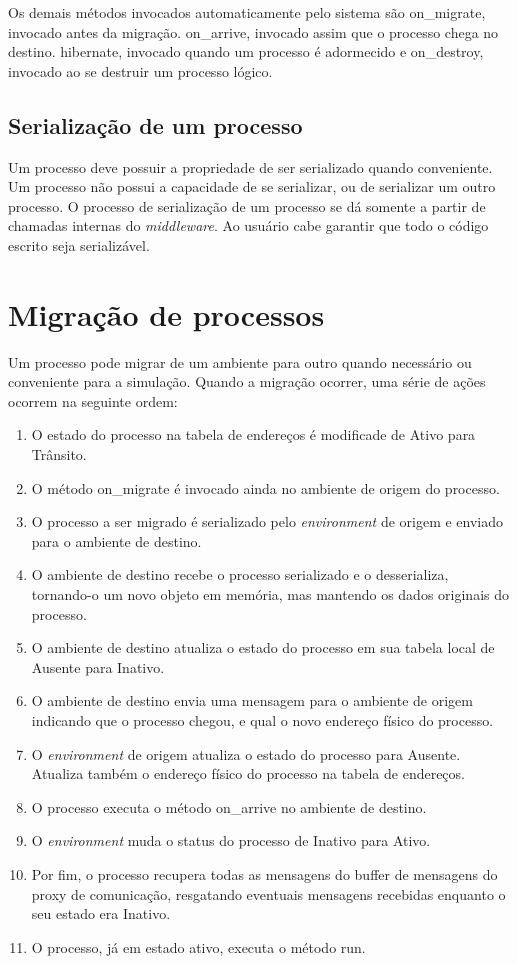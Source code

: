 Os demais métodos invocados automaticamente pelo sistema são on\_migrate, invocado antes da migração. on\_arrive, invocado assim que o processo chega no destino. hibernate, invocado quando um processo é adormecido e on\_destroy, invocado ao se destruir um processo lógico.

\subsection{Serialização de um processo}

Um processo deve possuir a propriedade de ser serializado quando conveniente. Um processo não possui a capacidade de se serializar, ou de serializar um outro processo. O processo de serialização de um processo se dá somente a partir de chamadas internas do \textit{middleware}. Ao usuário cabe garantir que todo o código escrito seja serializável.

\section{Migração de processos \label{migracao}}

Um processo pode migrar de um ambiente para outro quando necessário ou conveniente para a simulação. Quando a migração ocorrer, uma série de ações ocorrem na seguinte ordem:

\begin{enumerate}
\item O estado do processo na tabela de endereços é modificade de Ativo para Trânsito.
\item O método on\_migrate é invocado ainda no ambiente de origem do processo.
\item O processo a ser migrado é serializado pelo \textit{environment} de origem e enviado para o ambiente de destino.
\item O ambiente de destino recebe o processo serializado e o desserializa, tornando-o um novo objeto em memória, mas mantendo os dados originais do processo.
\item O ambiente de destino atualiza o estado do processo em sua tabela local de Ausente para Inativo.
\item O ambiente de destino envia uma mensagem para o ambiente de origem indicando que o processo chegou, e qual o novo endereço físico do processo.
\item O \textit{environment} de origem atualiza o estado do processo para Ausente. Atualiza também o endereço físico do processo na tabela de endereços.
\item O processo executa o método on\_arrive no ambiente de destino.
\item O \textit{environment} muda o status do processo de Inativo para Ativo.
\item Por fim, o processo recupera todas as mensagens do buffer de mensagens do proxy de comunicação, resgatando eventuais mensagens recebidas enquanto o seu estado era Inativo.
\item O processo, já em estado ativo, executa o método run.
\end{enumerate}

